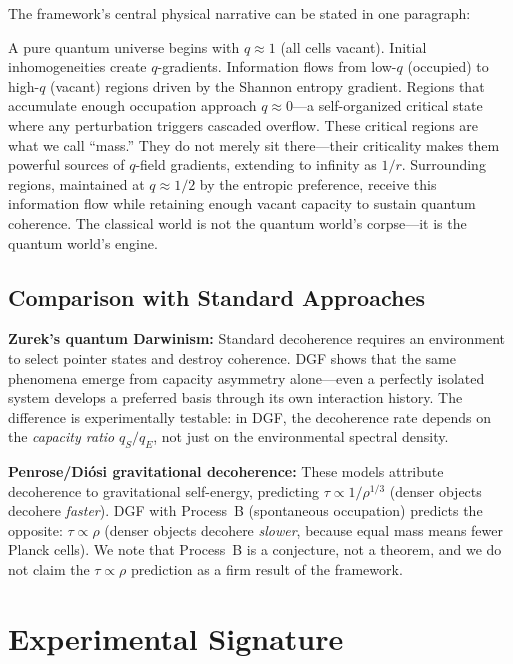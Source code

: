 \documentclass[reprint]{revtex4-2}
\begin{document}
The framework's central physical narrative can be stated in one paragraph:

A pure quantum universe begins with $q\approx 1$ (all cells vacant). Initial inhomogeneities create $q$-gradients. Information flows from low-$q$ (occupied) to high-$q$ (vacant) regions driven by the Shannon entropy gradient. Regions that accumulate enough occupation approach $q\approx 0$---a self-organized critical state where any perturbation triggers cascaded overflow. These critical regions are what we call ``mass.'' They do not merely sit there---their criticality makes them powerful sources of $q$-field gradients, extending to infinity as $1/r$. Surrounding regions, maintained at $q\approx 1/2$ by the entropic preference, receive this information flow while retaining enough vacant capacity to sustain quantum coherence. The classical world is not the quantum world's corpse---it is the quantum world's engine.

\subsection{Comparison with Standard Approaches}

\textbf{Zurek's quantum Darwinism:} Standard decoherence requires an environment to select pointer states and destroy coherence. DGF shows that the same phenomena emerge from capacity asymmetry alone---even a perfectly isolated system develops a preferred basis through its own interaction history. The difference is experimentally testable: in DGF, the decoherence rate depends on the \emph{capacity ratio} $q_S/q_E$, not just on the environmental spectral density.

\textbf{Penrose/Di\'osi gravitational decoherence:} These models attribute decoherence to gravitational self-energy, predicting $\tau\propto 1/\rho^{1/3}$ (denser objects decohere \emph{faster}). DGF with Process~B (spontaneous occupation) predicts the opposite: $\tau\propto\rho$ (denser objects decohere \emph{slower}, because equal mass means fewer Planck cells). We note that Process~B is a conjecture, not a theorem, and we do not claim the $\tau\propto\rho$ prediction as a firm result of the framework.

\section{Experimental Signature}
\end{document}
